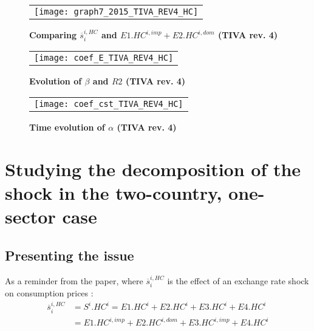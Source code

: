 \documentclass[11pt,a4paper]{article}
\begin{document}
\begin{figure}[!h]
	\centering
	\caption{\footnotesize{\textbf{Comparing $\overline{s}_{i}^{i,HC}$ and $E1.HC^{i,imp}+E2.HC^{i,dom}$ (TIVA rev. 4)}}}
	\begin{tabular}{c}
		\texttt{[image: graph7\_2015\_TIVA\_REV4\_HC]}\\
	\end{tabular}
	\label{fig:ratiodir_TiVA_REV4}
\end{figure}

\begin{figure}[!h]
	\centering
	\caption{\footnotesize{\textbf{Evolution of $\beta$ and $R2$ (TIVA rev. 4)}}}
	\begin{tabular}{c}
		\texttt{[image: coef\_E\_TIVA\_REV4\_HC]}\\
	\end{tabular}
	\label{fig:evolution_b_TiVA_REV4}
\end{figure}

\begin{figure}[!h]
	\centering
	\caption{\footnotesize{\textbf{Time evolution of $\alpha$ (TIVA rev. 4)}}}
	\begin{tabular}{c}
		\texttt{[image: coef\_cst\_TIVA\_REV4\_HC]}\\
	\end{tabular}
	\label{fig:evolution_cst_TiVA_REV4}
\end{figure}


\newpage
\section{Studying the decomposition of the shock in the two-country, one-sector case}\label{AnalyticalAppendix}
\subsection{Presenting the issue}

As a reminder from the paper, where $\overline{s}_{i}^{i,HC}$ is the effect of an exchange rate shock on consumption prices :  
\begin{equation}
\begin{array}{lccl}
\overline{s}_{i}^{i,HC}&=S^i.HC^i=E1.HC^i+E2.HC^i+E3.HC^i+E4.HC^i \\
&=E1.HC^{i,imp}+E2.HC^{i,dom}+E3.HC^{i,imp}+E4.HC^i
\end{array} 
\end{equation}
\end{document}
